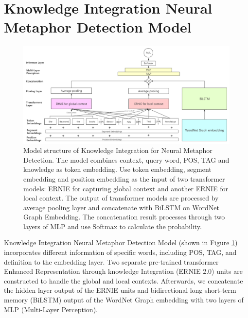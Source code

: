 \documentclass[11pt,a4paper]{article}
\begin{document}
\section{Knowledge Integration Neural Metaphor Detection Model}

\begin{figure}[htbp]
    \centering
    \includegraphics[scale=0.22]{asset/model2.png}
    \caption{Model structure of Knowledge Integration for Neural Metaphor Detection. The model combines context, query word, POS, TAG and knowledge as token embedding. Use token embedding, segment embedding and position embedding as the input of two transformer models: ERNIE for capturing global context and another ERNIE for local context. The output of transformer models are processed by average pooling layer and concatenate with BiLSTM on WordNet Graph Embedding. The concatenation result processes through two layers of MLP and use Softmax to calculate the probability.}
    \label{img1}
\end{figure}

Knowledge Integration Neural Metaphor Detection Model (shown in Figure \ref{img1}) incorporates different information of specific words, including POS, TAG, and definition to the embedding layer. Two separate pre-trained transformer Enhanced Representation through knowledge Integration (ERNIE 2.0) \cite{sun2020ernie} units are constructed to handle the global and local contexts. Afterwards, we concatenate the hidden layer output of the ERNIE units and bidirectional long short-term memory (BiLSTM) output of the WordNet Graph embedding with two layers of MLP (Multi-Layer Perception). 

\end{document}
